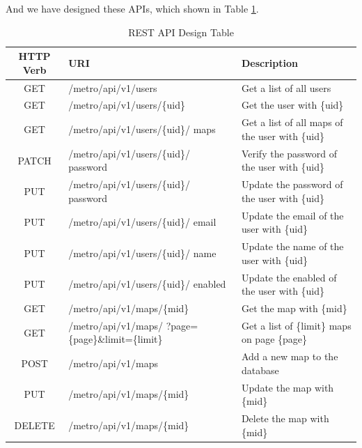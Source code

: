 And we have designed these APIs, which shown in Table \ref{tab:REST API Design Table}.
\begin{table}[!htb]
  \centering
  \begin{tabularx}{\textwidth}{>{\raggedright}cXX}
    \toprule[1.5pt]
    \textbf{HTTP Verb} & \textbf{URI} & \textbf{Description}
    \\ \midrule[1.5pt]
    GET & /metro/api/v1/users & Get a list of all users
    \\ \midrule
    GET & /metro/api/v1/users/\{uid\} & Get the user with \{uid\}
    \\ \midrule
    GET & /metro/api/v1/users/\{uid\}/ maps & Get a list of all maps of the user with \{uid\}
    \\ \midrule
    PATCH & /metro/api/v1/users/\{uid\}/ password & Verify the password of the user with \{uid\}
    \\ \midrule
    PUT & /metro/api/v1/users/\{uid\}/ password & Update the password of the user with \{uid\}
    \\ \midrule
    PUT & /metro/api/v1/users/\{uid\}/ email & Update the email of the user with \{uid\} \\ \midrule
    PUT & /metro/api/v1/users/\{uid\}/ name & Update the name of the user with \{uid\} \\ \midrule
    PUT & /metro/api/v1/users/\{uid\}/ enabled & Update the enabled of the user with \{uid\}
    \\ \midrule
    GET & /metro/api/v1/maps/\{mid\} & Get the map with \{mid\}
    \\ \midrule
    GET & /metro/api/v1/maps/ ?page=\{page\}\&limit=\{limit\} & Get a list of \{limit\} maps on page \{page\}
    \\ \midrule
    POST & /metro/api/v1/maps & Add a new map to the database
    \\ \midrule
    PUT & /metro/api/v1/maps/\{mid\} & Update the map with \{mid\}
    \\ \midrule
    DELETE & /metro/api/v1/maps/\{mid\} & Delete the map with \{mid\}
    \\ \bottomrule[1.5pt]
  \end{tabularx}
  \caption[REST API Design Table]{REST API Design Table}
  \label{tab:REST API Design Table}
\end{table}

